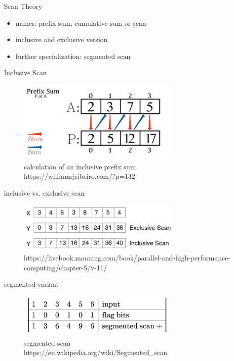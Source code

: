 \begin{frame}{Scan Theory}
	\begin{itemize}
		\item names: prefix sum, cumulative sum or scan
		\item inclusive and exclusive version
		\item further specialization: segmented scan
	\end{itemize}
\end{frame} 
\begin{frame}{Inclusive Scan}
	\begin{figure}
		\includegraphics[width=80mm]{wiki/prefix-sum.jpg}
		\caption{{calculation of an inclusive prefix sum\\ \tiny https://williamrjribeiro.com/?p=132}}
	\end{figure}
\end{frame}
\begin{frame}{inclusive vs. exclusive scan}
	\begin{figure}
		\includegraphics[width=80mm]{wiki/scans.png}
		\caption{{\tiny https://livebook.manning.com/book/parallel-and-high-performance-computing/chapter-5/v-11/}}
	\end{figure}
\end{frame}
\begin{frame}{segmented variant}
	\begin{figure}
		\includegraphics[width=80mm]{wiki/SegmentedScan.png}
		\caption{{segmented scan \\ \tiny https://en.wikipedia.org/wiki/Segmented\_scan}}
	\end{figure}
\end{frame}

